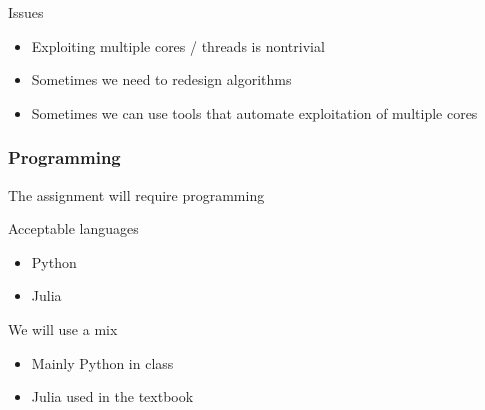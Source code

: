 \begin{frame}

    Issues
    \begin{itemize}
        \item Exploiting multiple cores / threads is nontrivial
            \vspace{0.5em}
            \vspace{0.5em}
        \item Sometimes we need to redesign algorithms
            \vspace{0.5em}
            \vspace{0.5em}
        \item Sometimes we can use tools that automate exploitation of multiple cores
    \end{itemize}

\end{frame}




\begin{frame}
    \frametitle{Programming}

    The assignment will require programming

            \vspace{0.5em}
            \vspace{0.5em}

    Acceptable languages

    \begin{itemize}
        \item Python
            \vspace{0.5em}
        \item Julia
    \end{itemize}

            \vspace{0.5em}
            \vspace{0.5em}
            \vspace{0.5em}
    We will use a mix

    \begin{itemize}
        \item Mainly Python in class
            \vspace{0.5em}
        \item Julia used in the textbook
    \end{itemize}


\end{frame}






